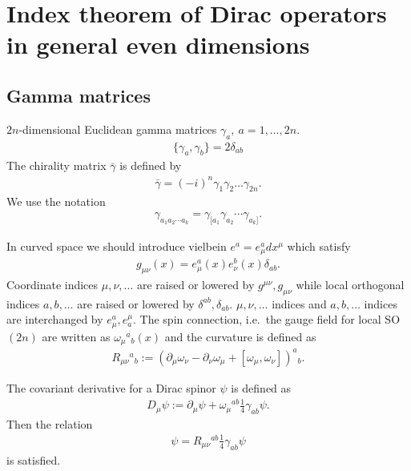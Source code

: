 \documentclass[12pt,a4paper]{article}
\newcommand{\del}{\partial}
\newcommand{\gammab}{\bar{\gamma}}
\begin{document}
\section{Index theorem of Dirac operators in general even dimensions}
\subsection{Gamma matrices}
$2n$-dimensional Euclidean gamma matrices $\gamma_a,\ a=1,\dots,2n$.
\begin{align*}
  \{ \gamma_a,\gamma_b \} = 2\delta_{ab}
\end{align*}
The chirality matrix $\gammab$ is defined by
\begin{align*}
  \gammab = (-i)^n \gamma_{1}\gamma_{2}\dots\gamma_{2n}.
\end{align*}
We use the notation
\begin{align*}
  \gamma_{a_1 a_2 \cdots a_k} = \gamma_{[a_1}\gamma_{a_2}\cdots \gamma_{a_k]}.%
\end{align*}

In curved space we should introduce vielbein $e^{a}=e^{a}_{\mu} dx^{\mu}$ which satisfy
\begin{align*}
  g_{\mu\nu}(x)=e^{a}_{\mu}(x)e^{b}_{\nu}(x)\delta_{ab}.
\end{align*}
Coordinate indices $\mu,\nu,\dots$ are raised or lowered by $g^{\mu\nu},g_{\mu\nu}$ while local orthogonal indices $a,b,\dots$ are raised or lowered by $\delta^{ab},\delta_{ab}$. 
$\mu,\nu,\dots$ indices and $a,b,\dots$ indices are interchanged by $e_{\mu}^{a},e^{\mu}_{a}$. 
The spin connection, i.e.\ the gauge field for local SO$(2n)$ are written as $\omega_{\mu}{}^{a}{}_{b}(x)$ and the curvature is defined as
\begin{align*}
  R_{\mu\nu}{}^{a}{}_{b}:=(\del_{\mu}\omega_{\nu}-\del_{\nu}\omega_{\mu}+[\omega_{\mu},\omega_{\nu}])^{a}{}_{b}.
\end{align*}

The covariant derivative for a Dirac spinor $\psi$ is defined as
\begin{align*}
  D_{\mu}\psi:=\del_{\mu}\psi+\omega_{\mu}{}^{ab}\frac14 \gamma_{ab}\psi.
\end{align*}
Then the relation
\begin{align*}
  [D_{\mu},D_{\nu}]\psi=R_{\mu\nu}{}^{ab}\frac14 \gamma_{ab}\psi
\end{align*}
is satisfied.
\end{document}
